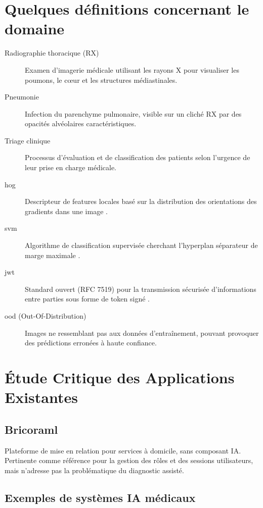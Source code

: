 \documentclass[12pt, a4paper]{report}
\begin{document}
\section{Quelques définitions concernant le domaine}

\begin{description}
  \item[Radiographie thoracique (RX)] Examen d'imagerie médicale utilisant les rayons X
        pour visualiser les poumons, le cœur et les structures médiastinales.
  \item[Pneumonie] Infection du parenchyme pulmonaire, visible sur un cliché RX
        par des opacités alvéolaires caractéristiques.
  \item[Triage clinique] Processus d'évaluation et de classification des patients
        selon l'urgence de leur prise en charge médicale.
  \item[\acrshort{hog}] Descripteur de features locales basé sur la distribution
        des orientations des gradients dans une image \cite{dalal2005}.
  \item[\acrshort{svm}] Algorithme de classification supervisée cherchant
        l'hyperplan séparateur de marge maximale \cite{cortes1995}.
  \item[\acrshort{jwt}] Standard ouvert (RFC 7519) pour la transmission sécurisée
        d'informations entre parties sous forme de token signé \cite{jones2015}.
  \item[\acrshort{ood} (Out-Of-Distribution)] Images ne ressemblant pas aux données
        d'entraînement, pouvant provoquer des prédictions erronées à haute confiance.
\end{description}

\section{Étude Critique des Applications Existantes}

\subsection{Bricoraml}

Plateforme de mise en relation pour services à domicile, sans composant IA.
Pertinente comme référence pour la gestion des rôles et des sessions utilisateurs,
mais n'adresse pas la problématique du diagnostic assisté.

\subsection{Exemples de systèmes IA médicaux}
\end{document}
